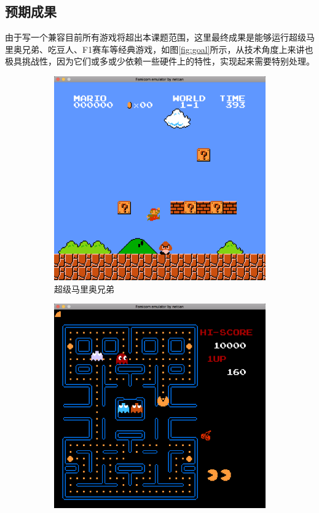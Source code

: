 \documentclass[a4paper]{ltxdoc}
\begin{document}
{\subsection{预期成果}
由于写一个兼容目前所有游戏将超出本课题范围，这里最终成果是能够运行超级马里奥兄弟、吃豆人、F1赛车等经典游戏，如图\ref{fig:goal}所示，从技术角度上来讲也极具挑战性，因为它们或多或少依赖一些硬件上的特性，实现起来需要特别处理。
\begin{figure}[h]
	\centering
		\begin{subfigure}[b]{0.49\textwidth}
			\includegraphics[width=\textwidth]{images/super_mario_bros.png}
			\caption{超级马里奥兄弟}
		\end{subfigure}
		\begin{subfigure}[b]{0.49\textwidth}
			\includegraphics[width=\textwidth]{images/pac_man.png}

\end{subfigure}
\end{figure}}
\end{document}
